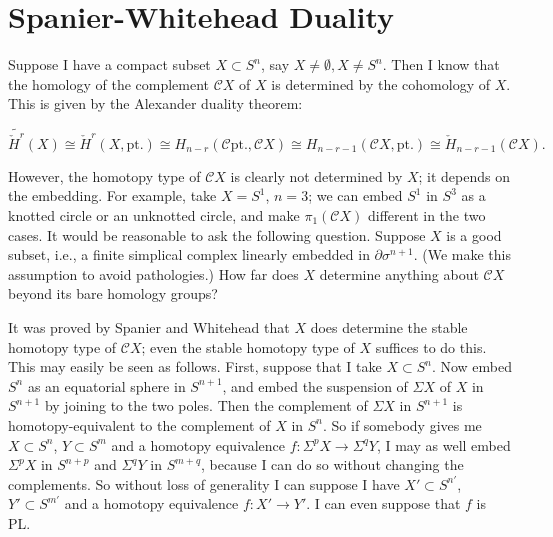 \documentclass[../main]{subfiles}
\begin{document}
\label{sec:p3c5}


\chapter{Spanier-Whitehead Duality}
Suppose I have a compact subset $X\subset S^n$, say $X\neq\emptyset,X\neq S^n$. Then I know that the homology of the complement $\mathcal{C} X$ of $X$ is determined by the cohomology of $X$. This is given by the Alexander duality theorem:

\begin{equation*}
    \widetilde{\check{H}^r}(X)\cong\check{H}^r(X,\mathrm{pt.})\cong H_{n-r}(\mathcal{C}\mathrm{pt.},\mathcal{C}X)\cong H_{n-r-1}(\mathcal{C}X,\mathrm{pt.})\cong\check{H}_{n-r-1}(\mathcal{C}X).
\end{equation*}

However, the homotopy type of $\mathcal{C}X$ is clearly not determined by $X$; it depends on the embedding. For example, take $X=S^1$, $n=3$; we can embed $S^1$ in $S^3$ as a knotted circle or an unknotted circle, and make $\pi_1(\mathcal{C}X)$ different in the two cases. It would be reasonable to ask the following question. Suppose $X$ is a good subset, i.e., a finite simplical complex linearly embedded in $\partial\sigma^{n+1}$. (We make this assumption to avoid pathologies.) How far does $X$ determine anything about $\mathcal{C}X$ beyond its bare homology groups?

It was proved by Spanier and Whitehead that $X$ does determine the stable homotopy type of $\mathcal{C}X$; even the stable homotopy type of $X$ suffices to do this. This may easily be seen as follows. First, suppose that I take $X\subset S^n$. Now embed $S^n$ as an equatorial sphere in $S^{n+1}$, and embed the suspension of $\Sigma X$ of $X$ in $S^{n+1}$ by joining to the two poles. Then the complement of $\Sigma X$ in $S^{n+1}$ is homotopy-equivalent to the complement of $X$ in $S^n$. So if somebody gives me $X\subset S^n$, $Y\subset S^m$ and a homotopy equivalence $f\colon \Sigma^pX\longrightarrow \Sigma^qY$, I may as well embed $\Sigma^pX$ in $S^{n+p}$ and $\Sigma^qY$ in $S^{m+q}$, because I can do so without changing the complements. So without loss of generality I can suppose I have $X'\subset S^{n'}$, $Y'\subset S^{m'}$ and a homotopy equivalence $f\colon X'\longrightarrow Y'$. I can even suppose that $f$ is PL.
\end{document}
